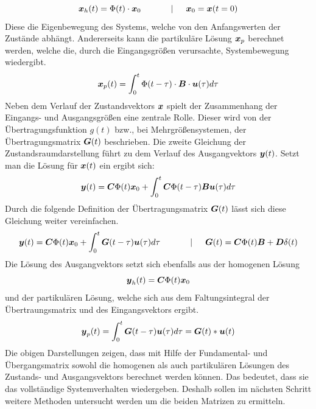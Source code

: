 \begin{equation}
\boldsymbol{x}_h(t) = \Phi(t)\cdot \boldsymbol{x}_0 \hspace{35pt} \vert \hspace{15pt} \boldsymbol{x}_0 = \boldsymbol{x}(t=0)
\end{equation}
Diese die Eigenbewegung des Systems, welche von den Anfangswerten der Zustände abhängt. Andererseits kann die partikuläre Lösung $\boldsymbol{x}_p$ berechnet werden, welche die, durch die Eingangsgrößen verursachte, Systembewegung wiedergibt.
\begin{equation}
\boldsymbol{x}_p(t) = \int^t_0 \Phi(t-\tau)\cdot \boldsymbol{B}\cdot \boldsymbol{u}(\tau)d\tau
\end{equation}
Neben dem Verlauf der Zustandsvektors $\boldsymbol{x}$ spielt der Zusammenhang der Eingangs- und Ausgangsgrößen eine zentrale Rolle. Dieser wird von der Übertragungsfunktion $g(t)$ bzw., bei Mehrgrößensystemen, der Übertragungsmatrix $\boldsymbol{G}(t)$ beschrieben.
Die zweite Gleichung der Zustandsraumdarstellung führt zu dem Verlauf des Ausgangvektors $\boldsymbol{y}(t)$. Setzt man die Lösung für $\boldsymbol{x}(t)$ ein ergibt sich:
\begin{equation}
\boldsymbol{y}(t) = \boldsymbol{C}\Phi(t)\boldsymbol{x}_0 + \int^t_0 \boldsymbol{C}\Phi(t-\tau)\boldsymbol{B}\boldsymbol{u}(\tau)d\tau
\end{equation}
Durch die folgende Definition der Übertragungsmatrix $\boldsymbol{G}(t)$ lässt sich diese Gleichung weiter vereinfachen.
\begin{equation}
\boldsymbol{y}(t) = \boldsymbol{C}\Phi(t)\boldsymbol{x}_0 + \int^t_0 \boldsymbol{G}(t-\tau)\boldsymbol{u}(\tau)d\tau \hspace{35pt} \vert \hspace{15pt} \boldsymbol{G}(t) = \boldsymbol{C}\Phi(t)\boldsymbol{B}+\boldsymbol{D}\delta(t)
\end{equation}
Die Lösung des Ausgangvektors setzt sich ebenfalls aus der homogenen Lösung
\begin{equation}
\boldsymbol{y}_h(t) = \boldsymbol{C}\Phi(t)\boldsymbol{x}_0
\end{equation}
und der partikulären Lösung, welche sich aus dem Faltungsintegral der Übertraungsmatrix und des Eingangsvektors ergibt.
\begin{equation}
\boldsymbol{y}_p(t) = \int^t_0 \boldsymbol{G}(t-\tau)\boldsymbol{u}(\tau)d\tau = \boldsymbol{G}(t)*\boldsymbol{u}(t)
\end{equation}
Die obigen Darstellungen zeigen, dass mit Hilfe der Fundamental- und Übergangsmatrix sowohl die homogenen als auch partikulären Lösungen des Zustands- und Ausgangsvektors berechnet werden können. Das bedeutet, dass sie das vollständige Systemverhalten wiedergeben. Deshalb sollen im nächsten Schritt weitere Methoden untersucht werden um die beiden Matrizen zu ermitteln.

